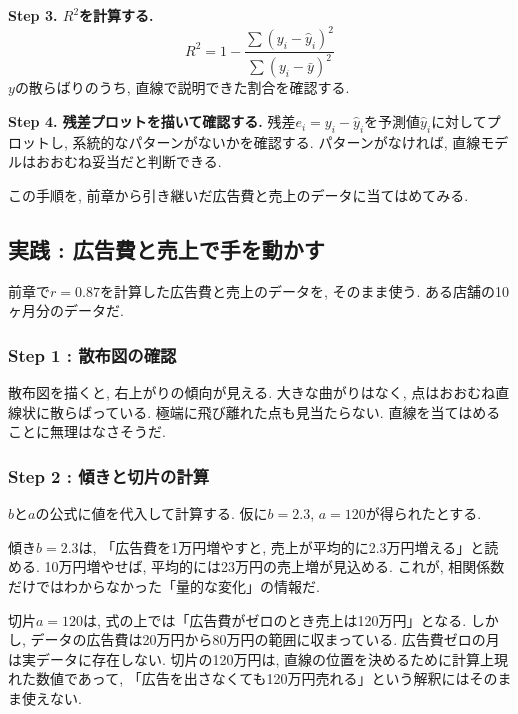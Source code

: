 \textbf{Step 3. $R^2$を計算する.}
\[
  R^2 = 1 - \frac{\sum(y_i - \hat{y}_i)^2}{\sum(y_i - \bar{y})^2}
\]
$y$の散らばりのうち, 直線で説明できた割合を確認する.

\textbf{Step 4. 残差プロットを描いて確認する.}
残差$e_i = y_i - \hat{y}_i$を予測値$\hat{y}_i$に対してプロットし, 系統的なパターンがないかを確認する.
パターンがなければ, 直線モデルはおおむね妥当だと判断できる.

この手順を, 前章から引き継いだ広告費と売上のデータに当てはめてみる.


\subsection{実践 : 広告費と売上で手を動かす}

前章で$r = 0.87$を計算した広告費と売上のデータを, そのまま使う.
ある店舗の10ヶ月分のデータだ.


\subsubsection*{Step 1 : 散布図の確認}


散布図を描くと, 右上がりの傾向が見える.
大きな曲がりはなく, 点はおおむね直線状に散らばっている.
極端に飛び離れた点も見当たらない.
直線を当てはめることに無理はなさそうだ.

\subsubsection*{Step 2 : 傾きと切片の計算}


$b$と$a$の公式に値を代入して計算する.
仮に$b = 2.3$, $a = 120$が得られたとする.


傾き$b = 2.3$は, 「広告費を1万円増やすと, 売上が平均的に2.3万円増える」と読める.
10万円増やせば, 平均的には23万円の売上増が見込める.
これが, 相関係数だけではわからなかった「量的な変化」の情報だ.

切片$a = 120$は, 式の上では「広告費がゼロのとき売上は120万円」となる.
しかし, データの広告費は20万円から80万円の範囲に収まっている.
広告費ゼロの月は実データに存在しない.
切片の120万円は, 直線の位置を決めるために計算上現れた数値であって, 「広告を出さなくても120万円売れる」という解釈にはそのまま使えない.

